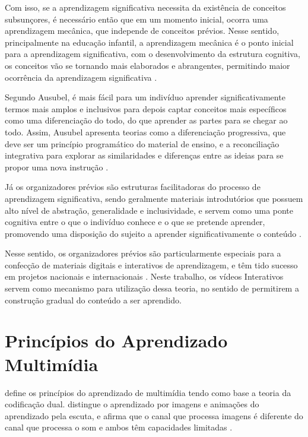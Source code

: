 Com isso, se a aprendizagem significativa necessita da existência de conceitos subsunçores, é necessário então que em um momento inicial, ocorra uma aprendizagem mecânica, que independe de conceitos prévios. Nesse sentido, principalmente na educação infantil, a aprendizagem mecânica é o ponto inicial para a aprendizagem significativa, com o desenvolvimento da estrutura cognitiva, os conceitos vão se tornando mais elaborados e abrangentes, permitindo maior ocorrência da aprendizagem significativa \cite{ausubel2000}.

Segundo Ausubel, é mais fácil para um indivíduo aprender significativamente termos mais amplos e inclusivos para depois captar conceitos mais específicos como uma diferenciação do todo, do que aprender as partes para se chegar ao todo. Assim, Ausubel apresenta teorias como a diferenciação progressiva, que deve ser um princípio programático do material de ensino, e a reconciliação integrativa para explorar as similaridades e diferenças entre as ideias para se propor uma nova instrução \cite{ausubel2000, fragelli2010}. 

Já os organizadores prévios são estruturas facilitadoras do processo de aprendizagem significativa, sendo geralmente materiais introdutórios que possuem alto nível de abstração, generalidade e inclusividade, e servem como uma ponte cognitiva entre o que o indivíduo conhece e o que se pretende aprender, promovendo uma disposição do sujeito a aprender significativamente o conteúdo \cite{ausubel2000, tavares2010}.

Nesse sentido, os organizadores prévios são particularmente especiais para a confecção de materiais digitais e interativos de aprendizagem, e têm tido sucesso em projetos nacionais e internacionais \cite{tavares2010, novak2006}. Neste trabalho, os vídeos Interativos servem como mecanismo para utilização dessa teoria, no sentido de permitirem a construção gradual do conteúdo a ser aprendido.


\section{Princípios do Aprendizado Multimídia}

 define os princípios do aprendizado de multimídia tendo como base a teoria da codificação dual.  distingue o aprendizado por imagens e animações do aprendizado pela escuta, e afirma que o canal que processa imagens é diferente do canal que processa o som e ambos têm capacidades limitadas \cite{tavares2010}.

